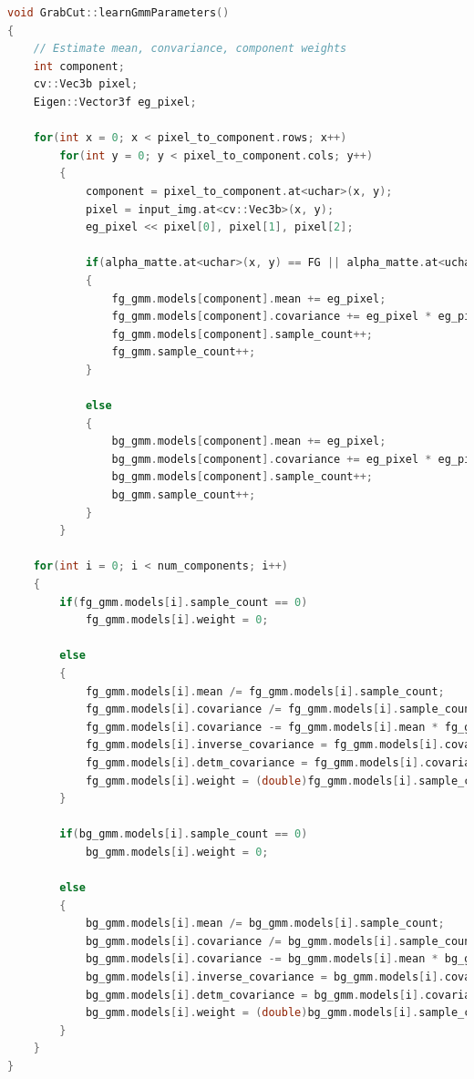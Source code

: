 \documentclass[a4paper,11]{article}
\begin{document}
  \begin{lstlisting}[language=C++]
 void GrabCut::learnGmmParameters()
{
	// Estimate mean, convariance, component weights
	int component;
	cv::Vec3b pixel;
	Eigen::Vector3f eg_pixel;

	for(int x = 0; x < pixel_to_component.rows; x++)
		for(int y = 0; y < pixel_to_component.cols; y++)
		{
			component = pixel_to_component.at<uchar>(x, y);
			pixel = input_img.at<cv::Vec3b>(x, y);
			eg_pixel << pixel[0], pixel[1], pixel[2];

			if(alpha_matte.at<uchar>(x, y) == FG || alpha_matte.at<uchar>(x, y) == PFG)
			{
				fg_gmm.models[component].mean += eg_pixel;
				fg_gmm.models[component].covariance += eg_pixel * eg_pixel.transpose();
				fg_gmm.models[component].sample_count++;
				fg_gmm.sample_count++;
			}

			else
			{
				bg_gmm.models[component].mean += eg_pixel;
				bg_gmm.models[component].covariance += eg_pixel * eg_pixel.transpose();
				bg_gmm.models[component].sample_count++;
				bg_gmm.sample_count++;
			}
		}
	
	for(int i = 0; i < num_components; i++)
	{
		if(fg_gmm.models[i].sample_count == 0)
			fg_gmm.models[i].weight = 0;

		else
		{
			fg_gmm.models[i].mean /= fg_gmm.models[i].sample_count;
			fg_gmm.models[i].covariance /= fg_gmm.models[i].sample_count;
			fg_gmm.models[i].covariance -= fg_gmm.models[i].mean * fg_gmm.models[i].mean.transpose();
			fg_gmm.models[i].inverse_covariance = fg_gmm.models[i].covariance.inverse();
			fg_gmm.models[i].detm_covariance = fg_gmm.models[i].covariance.determinant();
			fg_gmm.models[i].weight = (double)fg_gmm.models[i].sample_count / fg_gmm.sample_count;
		}

		if(bg_gmm.models[i].sample_count == 0)
			bg_gmm.models[i].weight = 0;

		else
		{
			bg_gmm.models[i].mean /= bg_gmm.models[i].sample_count;
			bg_gmm.models[i].covariance /= bg_gmm.models[i].sample_count;
			bg_gmm.models[i].covariance -= bg_gmm.models[i].mean * bg_gmm.models[i].mean.transpose();
			bg_gmm.models[i].inverse_covariance = bg_gmm.models[i].covariance.inverse();
			bg_gmm.models[i].detm_covariance = bg_gmm.models[i].covariance.determinant();
			bg_gmm.models[i].weight = (double)bg_gmm.models[i].sample_count / bg_gmm.sample_count;
		}
	}
}
  \end{lstlisting}

  \vspace{1em}
  
\end{document}
